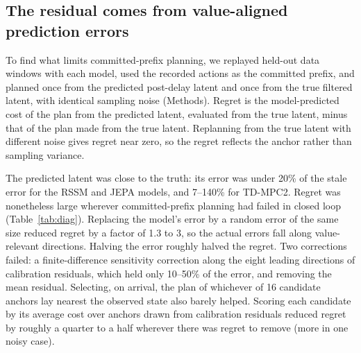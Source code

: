 \documentclass[aps,physrev,\manuscriptlayout,superscriptaddress,
  longbibliography,amsmath,amssymb]{revtex4-2}
\begin{document}
\subsection{The residual comes from value-aligned prediction errors}\label{sec:diagnosis}

To find what limits committed-prefix planning, we replayed held-out data windows with each model, used the recorded actions as the committed prefix, and planned once from the predicted post-delay latent and once from the true filtered latent, with identical sampling noise (Methods). Regret is the model-predicted cost of the plan from the predicted latent, evaluated from the true latent, minus that of the plan made from the true latent. Replanning from the true latent with different noise gives regret near zero, so the regret reflects the anchor rather than sampling variance.

The predicted latent was close to the truth: its error was under 20\% of the stale error for the RSSM and JEPA models, and 7--140\% for TD-MPC2. Regret was nonetheless large wherever committed-prefix planning had failed in closed loop (Table~\ref{tab:diag}). Replacing the model's error by a random error of the same size reduced regret by a factor of 1.3 to 3, so the actual errors fall along value-relevant directions. Halving the error roughly halved the regret. Two corrections failed: a finite-difference sensitivity correction along the eight leading directions of calibration residuals, which held only 10--50\% of the error, and removing the mean residual. Selecting, on arrival, the plan of whichever of 16 candidate anchors lay nearest the observed state also barely helped. Scoring each candidate by its average cost over anchors drawn from calibration residuals reduced regret by roughly a quarter to a half wherever there was regret to remove (more in one noisy case).
\end{document}
